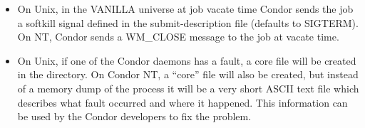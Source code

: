 \begin{itemize}
\item On Unix, in the VANILLA universe at job vacate time Condor sends the
job a softkill signal defined in the submit-description file (defaults to
SIGTERM).  On NT, Condor sends a WM\_CLOSE message to the job at vacate
time.

\item On Unix, if one of the Condor daemons has a fault, a core file will be
created in the  directory.  On Condor NT, a ``core'' file will also
be created, but instead of a memory dump of the process it will be a very
short ASCII text file which describes what fault occurred and where it
happened.  This information can be used by the Condor developers to fix the
problem.

\end{itemize}

